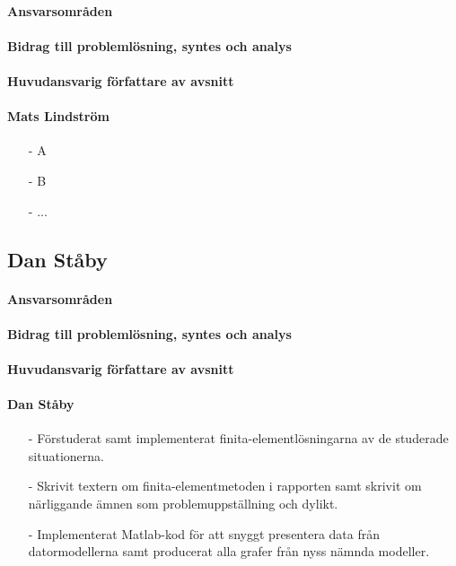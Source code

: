 \documentclass[12pt,a4paper]{article}
\begin{document}
\paragraph{Ansvarsområden}

\paragraph{Bidrag till problemlösning, syntes och analys}

\paragraph{Huvudansvarig författare av avsnitt}


\paragraph{Mats Lindström}
\begin{itemize}
\item[-] A
\item[-] B
\item[-] ...
\end{itemize}



\subsection*{Dan Ståby}

\paragraph{Ansvarsområden}

\paragraph{Bidrag till problemlösning, syntes och analys}

\paragraph{Huvudansvarig författare av avsnitt}

\paragraph{Dan Ståby}
\begin{itemize}
\item[-] Förstuderat samt implementerat finita-elementlösningarna av de studerade situationerna.
\item[-] Skrivit textern om finita-elementmetoden i rapporten samt skrivit om närliggande ämnen som problemuppställning och dylikt. 
\item[-] Implementerat Matlab-kod för att snyggt presentera data från datormodellerna samt producerat alla grafer från
nyss nämnda modeller.
\end{itemize}
\end{document}
